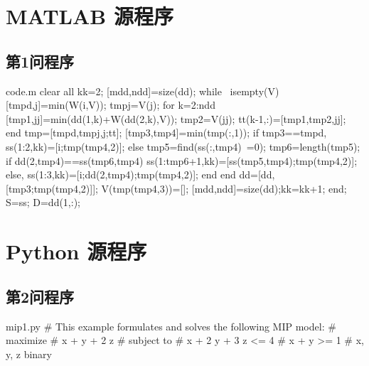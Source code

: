 \documentclass[bwprint]{gmcmthesis}
\begin{document}
\begin{appendices}  %
    \section{MATLAB 源程序}    %
    \renewcommand{\thesubsection}{A\thinskip.\thinskip\arabic{subsection}}
        \subsection{第1问程序}  %
        \vspace{-2ex}
        
        \begin{Matlab}{code.m}
        clear all
        kk=2;
        [mdd,ndd]=size(dd);
        while ~isempty(V)
            [tmpd,j]=min(W(i,V));
            tmpj=V(j);
            for k=2:ndd
                [tmp1,jj]=min(dd(1,k)+W(dd(2,k),V));
                tmp2=V(jj);
                tt(k-1,:)=[tmp1,tmp2,jj];
            end
            tmp=[tmpd,tmpj,j;tt];
            [tmp3,tmp4]=min(tmp(:,1));
            if tmp3==tmpd,
                ss(1:2,kk)=[i;tmp(tmp4,2)];
            else
                tmp5=find(ss(:,tmp4)~=0);
                tmp6=length(tmp5);
                if dd(2,tmp4)==ss(tmp6,tmp4)
                    ss(1:tmp6+1,kk)=[ss(tmp5,tmp4);tmp(tmp4,2)];
                else, ss(1:3,kk)=[i;dd(2,tmp4);tmp(tmp4,2)];
                end
            end
            dd=[dd,[tmp3;tmp(tmp4,2)]];
            V(tmp(tmp4,3))=[];
            [mdd,ndd]=size(dd);kk=kk+1;
        end;
        S=ss; D=dd(1,:);
        \end{Matlab}
        \vspace{2ex}
    
    \clearpage
    \section{Python 源程序}    %
    \renewcommand{\thesubsection}{B\thinskip.\thinskip\arabic{subsection}}
        \subsection{第2问程序}  %
        \vspace{-2ex}
        \begin{Python}{mip1.py}
        # This example formulates and solves the following  MIP model:
        #  maximize
        #        x +   y + 2 z
        #  subject to
        #        x + 2 y + 3 z <= 4
        #        x +   y       >= 1
        #        x, y, z binary
        

\end{Python}
\end{appendices}
\end{document}
